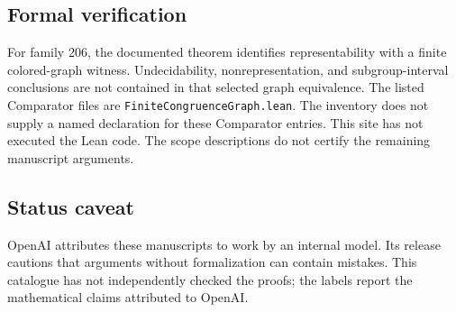 \documentclass[11pt]{article}
\begin{document}
\subsection{Formal verification}
For family 206, the documented theorem identifies representability with a finite colored-graph witness. Undecidability, nonrepresentation, and subgroup-interval conclusions are not contained in that selected graph equivalence. The listed Comparator files are \texttt{FiniteCongruenceGraph.lean}. The inventory does not supply a named declaration for these Comparator entries. This site has not executed the Lean code. The scope descriptions do not certify the remaining manuscript arguments.

\subsection{Status caveat}
OpenAI attributes these manuscripts to work by an internal model. Its release cautions that arguments without formalization can contain mistakes. This catalogue has not independently checked the proofs; the labels report the mathematical claims attributed to OpenAI.
\end{document}
